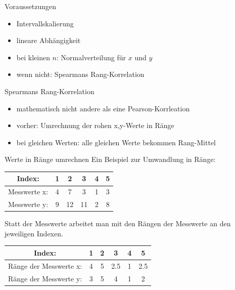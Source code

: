 \begin{frame}
  {Voraussetzungen}
  \begin{itemize}[<+->]
    \item \alert{Intervallskalierung}
    \item \alert{lineare} Abhängigkeit
    \item bei kleinen $n$: \alert{Normalverteilung} für $x$ und $y$
      \vspace{1cm}
    \item wenn nicht: \alert{Spearmans Rang-Korrelation}
  \end{itemize}
\end{frame}

\begin{frame}
  {Spearmans Rang-Korrelation}
  \begin{itemize}[<+->]
    \item mathematisch \alert{nicht andere als eine Pearson-Korrleation}
    \item vorher: Umrechnung der rohen x,y-Werte in \alert{Ränge}
    \item bei gleichen Werten: \alert{alle gleichen Werte bekommen Rang-Mittel}
  \end{itemize}
\end{frame}

\begin{frame}
  {Werte in Ränge umrechnen}
  Ein Beispiel zur Umwandlung in Ränge:
  \begin{center}
    \begin{tabular}[h!]{|c||c|c|c|c|c|}
      \hline
      Index: & 1 & 2 & 3 & 4 & 5 \\
      \hline
      \hline
      Messwerte x:& 4 & 7 & 3 & 1 & 3 \\
      \hline
      Messwerte y: & 9 & 12 & 11 & 2 & 8 \\
      \hline
    \end{tabular}
  \end{center}
  Statt der Messwerte arbeitet man mit den Rängen der Messwerte an den jeweiligen Indexen.
  \begin{center}
    \begin{tabular}[h!]{|c||c|c|c|c|c|}
      \hline
      Index: & 1 & 2 & 3 & 4 & 5 \\
      \hline
      \hline
      Ränge der Messwerte x:& 4 & 5 & 2.5 & 1 & 2.5 \\
      \hline
      Ränge der Messwerte y: & 3 & 5 & 4 & 1 & 2 \\
      \hline
    \end{tabular}
  \end{center}
\end{frame}

